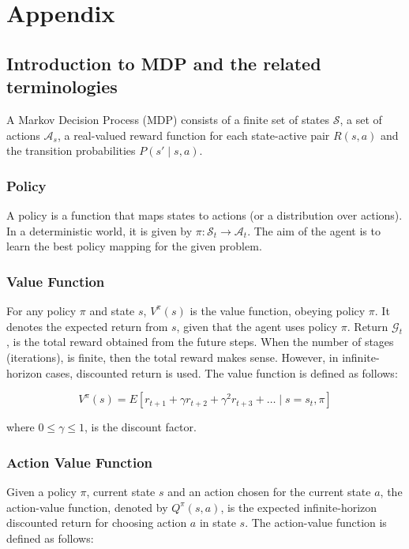 \section*{Appendix}
\subsection*{Introduction to MDP and the related terminologies}

A Markov Decision Process (MDP) consists of a finite set of states \(\mathcal{S}\),
a set of actions \(\mathcal{A}_s\), a real-valued reward function for each state-active pair
\(R(s,a)\) and the transition probabilities \(P(s' \mid s,a)\).

\subsubsection*{Policy}
A policy is a function that maps states to actions (or a distribution over actions).
In a deterministic world, it is given by \(\pi:\mathcal{S}_t \rightarrow \mathcal{A}_t\).
The aim of the agent is to learn the best policy mapping for the given problem.

\subsubsection*{Value Function}
For any policy \(\pi\) and state \(s\), \(V^\pi (s)\) is the value function, obeying policy \(\pi\).
It denotes the expected return from \(s\), given that the agent uses policy \(\pi\).
Return \(\mathcal{G}_t\), is the total reward obtained from the future steps.
When the number of stages (iterations), is finite, then the total reward makes sense.
However, in infinite-horizon cases, discounted return is used.
The value function is defined as follows:

\begin{equation}
    V^\pi (s)=E[r_{t+1}+\gamma r_{t+2}+ \gamma^2 r_{t+3} + \dots \mid s=s_t,\pi]
\end{equation}

where \(0 \leq \gamma  \leq 1\), is the discount factor.

\subsubsection*{Action Value Function}
Given a policy \(\pi\), current state \(s\) and an action chosen for the current state \(a\),
the action-value function, denoted by \(Q^\pi (s,a)\), is the expected infinite-horizon discounted return
for choosing action \(a\) in state \(s\). The action-value function is defined as follows:

